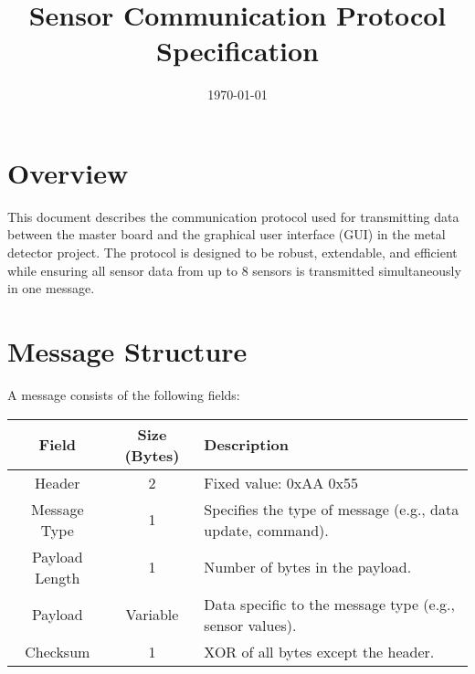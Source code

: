 \documentclass{article}
\title{Sensor Communication Protocol Specification}
\author{}
\date{\today}
\begin{document}
\maketitle

\section{Overview}
This document describes the communication protocol used for transmitting data between the master board and the graphical user interface (GUI) in the metal detector project. The protocol is designed to be robust, extendable, and efficient while ensuring all sensor data from up to 8 sensors is transmitted simultaneously in one message.

\section{Message Structure}
A message consists of the following fields:
\begin{center}
    \begin{tabular}{|c|c|l|}
        \hline
        \textbf{Field} & \textbf{Size (Bytes)} & \textbf{Description} \\
        \hline
        Header & 2 & Fixed value: 0xAA 0x55 \\
        \hline
        Message Type & 1 & Specifies the type of message (e.g., data update, command). \\
        \hline
        Payload Length & 1 & Number of bytes in the payload. \\
        \hline
        Payload & Variable & Data specific to the message type (e.g., sensor values). \\
        \hline
        Checksum & 1 & XOR of all bytes except the header. \\
        \hline
    \end{tabular}
\end{center}
\end{document}
